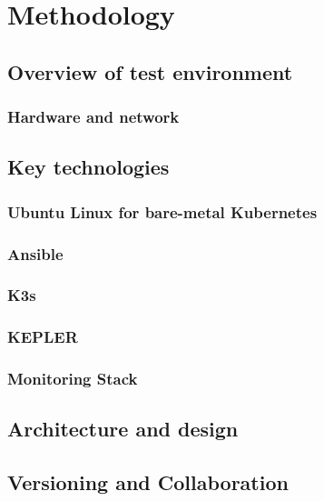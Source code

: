 
\chapter{Methodology} %
\label{Chapter2}

\section{Overview of test environment}

\subsection{Hardware and network}

\section{Key technologies}

\subsection{Ubuntu Linux for bare-metal Kubernetes}
\subsection{Ansible}
\subsection{K3s}
\subsection{KEPLER}
\subsection{Monitoring Stack}

\section{Architecture and design}

\section{Versioning and Collaboration}